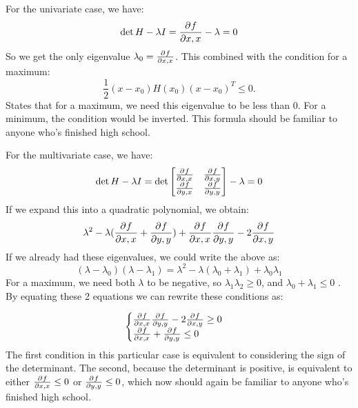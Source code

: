 \ex{}
{
    For the univariate case, we have:
    \begin{equation}
        \det{H - \lambda I} = \frac{\partial^{}f}{\partial x,x^{}} - \lambda = 0
    \end{equation}
    So we get the only eigenvalue $\lambda_0 = \frac{\partial^{}f}{\partial x,x^{}}$. This combined with the condition for a maximum:
    \[
\frac{1}{2} (x-x_0)H(x_0)(x-x_0)^{T} \le 0
    .\] 
    States that for a maximum, we need  this eigenvalue to be less than 0. 
    For a minimum, the condition would be inverted.
    This formula should be familiar to anyone who's finished high school.

    For the multivariate case, we have:
    \begin{equation}
        \det{H - \lambda I} =  \det{ \begin{bmatrix}
                \frac{\partial^{}f}{\partial x,x^{}} & \frac{\partial^{}f}{\partial x,y^{}} \\
                \frac{\partial^{}f}{\partial y,x^{}} & \frac{\partial^{}f}{\partial y,y^{}}
        \end{bmatrix} 
    - \lambda }= 0
    \end{equation}
    If we expand this into a quadratic polynomial, we obtain:
    \begin{equation}
        \lambda^{2} - \lambda( \frac{\partial^{}f}{\partial x,x^{}}  + \frac{\partial^{}f}{\partial y,y^{}})+  \frac{\partial^{}f}{\partial x,x^{}} \frac{\partial^{}f}{\partial y,y^{}} - 2 \frac{\partial^{}f}{\partial x,y^{}}
    \end{equation}
    If we already had these eigenvalues, we could write the above as:
    \begin{equation}
        (\lambda - \lambda_0)(\lambda - \lambda_1) = \lambda^{2} -\lambda(\lambda_0+\lambda_1) + \lambda_0 \lambda_1
    \end{equation}
    \clearpage
    For a maximum, we need both $\lambda$ to be negative, so $\lambda_1\lambda_2 \ge 0$, and $\lambda_0+\lambda_1 \le 0$ . By equating these 2 equations we can rewrite these conditions as:

    \begin{equation}
        \begin{cases}
              \frac{\partial^{}f}{\partial x,x^{}} \frac{\partial^{}f}{\partial y,y^{}} - 2 \frac{\partial^{}f}{\partial x,y^{}} \ge 0 \\
     \frac{\partial^{}f}{\partial x,x^{}}  + \frac{\partial^{}f}{\partial y,y^{}} \le 0
        \end{cases}
    \end{equation}
    The first condition in this particular case is equivalent to considering the sign of the determinant. The second, because the determinant is positive, is equivalent to either $ \frac{\partial^{}f}{\partial x,x^{}} \le 0$ or $ \frac{\partial^{}f}{\partial y,y^{}} \le 0$, which now should again be familiar to anyone who's finished high school.

}

